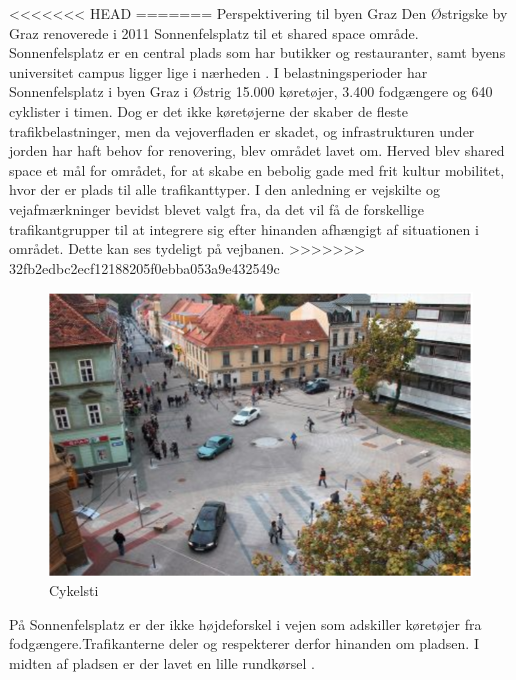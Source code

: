 <<<<<<< HEAD
=======
Perspektivering til byen Graz
Den Østrigske by Graz renoverede i 2011 Sonnenfelsplatz til et shared space område. Sonnenfelsplatz er en central plads som har butikker og restauranter, samt byens universitet campus ligger lige i nærheden \autocite{graz}.
 I belastningsperioder har Sonnenfelsplatz i byen Graz i Østrig 15.000 køretøjer, 3.400 fodgængere og 640 cyklister i timen. Dog er det ikke køretøjerne der skaber de fleste trafikbelastninger, men da vejoverfladen er skadet, og infrastrukturen under jorden har haft behov for renovering, blev området lavet om. Herved blev shared space et mål for området, for at skabe en bebolig gade med frit kultur mobilitet, hvor der er plads til alle trafikanttyper. I den anledning er vejskilte og vejafmærkninger bevidst blevet valgt fra, da det vil få de forskellige trafikantgrupper til at integrere sig efter hinanden afhængigt af situationen i området. Dette kan ses tydeligt på vejbanen.
>>>>>>> 32fb2edbc2ecf12188205f0ebba053a9e432549c
 \begin{figure}[htbp]
   \centering
   \begin{adjustbox}{max width=\textwidth}
     \includegraphics{figures/Billederogfigur/Perspektivering/en_andne_by.png}
  \end{adjustbox}
   \caption{Cykelsti \autocite{sonne}}
    \label{fig:cykelsti}
 \end{figure}
 
 På Sonnenfelsplatz er der ikke højdeforskel i vejen som adskiller køretøjer fra fodgængere.Trafikanterne deler og respekterer derfor hinanden om pladsen. I midten af pladsen er der lavet en lille rundkørsel \autocite{sonne}.

